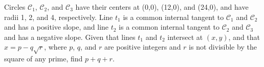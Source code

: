 Circles $\mathcal{C}_1$, $\mathcal{C}_2$, and $\mathcal{C}_3$ have their centers at (0,0), (12,0), and (24,0), and have radii 1, 2, and 4, respectively. Line $t_1$ is a common internal tangent to $\mathcal{C}_1$ and $\mathcal{C}_2$ and has a positive slope, and line $t_2$ is a common internal tangent to $\mathcal{C}_2$ and $\mathcal{C}_3$ and has a negative slope. Given that lines $t_1$ and $t_2$ intersect at $(x,y)$, and that $x=p-q\sqrt{r}$, where $p$, $q$, and $r$ are positive integers and $r$ is not divisible by the square of any prime, find $p+q+r$.